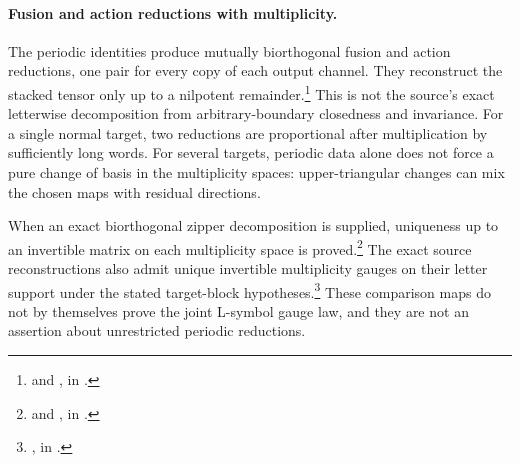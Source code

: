 \documentclass{article}
\begin{document}
\paragraph{Fusion and action reductions with multiplicity.}
The periodic identities produce mutually biorthogonal fusion and action
reductions, one pair for every copy of each output channel. They reconstruct
the stacked tensor only up to a nilpotent remainder.\footnote{
     and
    , in
    .}
This is not the source's exact letterwise decomposition from
arbitrary-boundary closedness and invariance. For a single normal target,
two reductions are proportional after multiplication by sufficiently long
words. For several targets, periodic data alone does not force a pure
change of basis in the multiplicity spaces: upper-triangular changes can
mix the chosen maps with residual directions.

When an exact biorthogonal zipper decomposition is supplied, uniqueness up
to an invertible matrix on each multiplicity space is proved.\footnote{
     and
    , in
    .}
The exact source reconstructions also admit unique invertible
multiplicity gauges on their letter support under the stated target-block
hypotheses.\footnote{
    ,
    in .}
These comparison maps do not by themselves prove the joint L-symbol gauge
law, and they are not an assertion about unrestricted periodic reductions.
\end{document}
